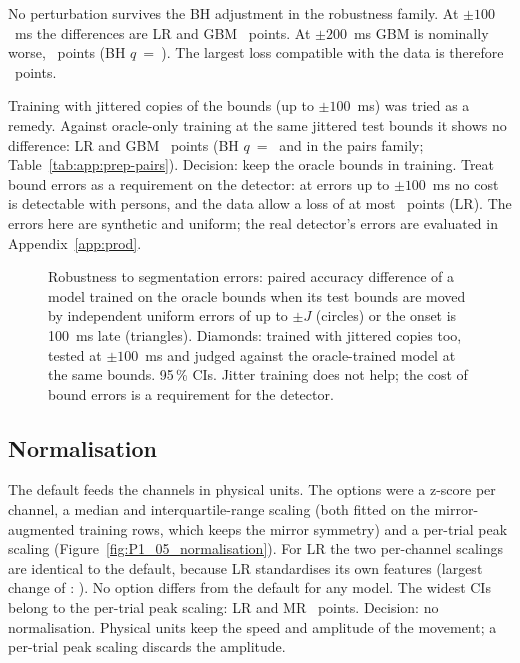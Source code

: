 No perturbation survives the BH adjustment in the robustness family. At $\pm 100$~ms the differences are
LR  and GBM ~points. At $\pm 200$~ms GBM is nominally worse,
~points (BH $q$~=~). The largest loss compatible with the data
is therefore ~points.

Training with jittered copies of the bounds (up to $\pm 100$~ms) was tried as a remedy. Against oracle-only
training at the same jittered test bounds it shows no difference: LR 
and GBM ~points (BH $q$~=~ and
 in the pairs family; Table~\ref{tab:app:prep-pairs}).
Decision: keep the oracle bounds in training. Treat bound errors as a requirement on the detector: at
errors up to $\pm 100$~ms no cost is detectable with  persons, and the data allow a loss of
at most ~points (LR). The errors here are synthetic and uniform; the real
detector's errors are evaluated in Appendix~\ref{app:prod}.

\begin{figure}[htbp]
\centering
{}
\caption{Robustness to segmentation errors: paired accuracy difference of a model trained on the oracle
bounds when its test bounds are moved by independent uniform errors of up to $\pm J$ (circles) or the
onset is 100~ms late (triangles). Diamonds: trained with jittered copies too, tested at $\pm 100$~ms and
judged against the oracle-trained model at the same bounds. 95\,\% CIs. Jitter training does not help; the
cost of bound errors is a requirement for the detector.}
\label{fig:P1_03_segmentation}\label{fig:app:prep-segmentation}
\end{figure}


\subsection{Normalisation}\label{app:prep:norm}

The default feeds the channels in physical units. The options were a z-score per channel, a median and
interquartile-range scaling (both fitted on the mirror-augmented training rows, which keeps the mirror
symmetry) and a per-trial peak scaling (Figure~\ref{fig:P1_05_normalisation}). For LR the two per-channel
scalings are identical to the default, because LR standardises its own features (largest change of
\pright{}: ). No option differs from the default for any model. The widest CIs
belong to the per-trial peak scaling: LR  and MR
~points. Decision: no normalisation. Physical units keep the speed and
amplitude of the movement; a per-trial peak scaling discards the amplitude.

